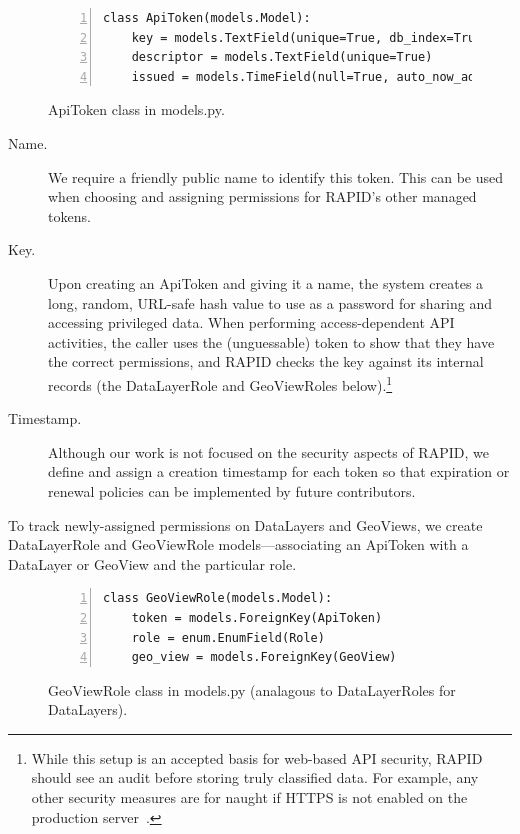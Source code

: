 \begin{figure}[ht]
\vspace{18pt}
\begin{Verbatim}[samepage=true,baselinestretch=1,numbers=left,xleftmargin=12mm]
class ApiToken(models.Model):
    key = models.TextField(unique=True, db_index=True)
    descriptor = models.TextField(unique=True)
    issued = models.TimeField(null=True, auto_now_add=True)
\end{Verbatim}
\label{fig:apitoken}
\vspace{-18pt}
\caption{ApiToken class in models.py.}
\end{figure}

\begin{description}
\item[Name.] 
We require a friendly public name to identify this token. This can be used when choosing and assigning permissions for RAPID's other managed tokens.

\item[Key.] 
Upon creating an ApiToken and giving it a name, the system creates a long, random, URL-safe hash value to use as a password for sharing and accessing privileged data. When performing access-dependent API activities, the caller uses the (unguessable) token to show that they have the correct permissions, and RAPID checks the key against its internal records (the DataLayerRole and GeoViewRoles below).\footnote{While this setup is an accepted basis for web-based API security, RAPID should see an audit before storing truly classified data. For example, any other security measures are for naught if HTTPS is not enabled on the production server~\cite{Stormpath,Palmer}. }

\item[Timestamp.] 
Although our work is not focused on the security aspects of RAPID, we define and assign a creation timestamp for each token so that expiration or renewal policies can be implemented by future contributors.

\end{description}
To track newly-assigned permissions on DataLayers and GeoViews, we create DataLayerRole and GeoViewRole models---associating an ApiToken with a DataLayer or GeoView and the particular role.

\begin{figure}[ht]
\vspace{10pt}
\begin{Verbatim}[samepage=true,baselinestretch=1,numbers=left,xleftmargin=12mm]
class GeoViewRole(models.Model):
    token = models.ForeignKey(ApiToken)
    role = enum.EnumField(Role)
    geo_view = models.ForeignKey(GeoView)
\end{Verbatim}
\caption{GeoViewRole class in models.py (analagous to DataLayerRoles for DataLayers).}
\vspace{10pt}
\label{fig:geoviewrole}
\end{figure}

